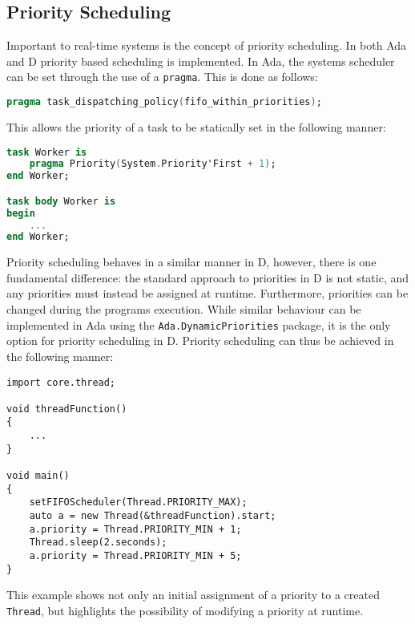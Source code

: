 \subsection{Priority Scheduling}
Important to real-time systems is the concept of priority scheduling. In both
Ada and D priority based scheduling is implemented. In Ada, the systems scheduler can
be set through the use of a \texttt{pragma}. This is done as follows: 
\begin{lstlisting}[language=Ada]
pragma task_dispatching_policy(fifo_within_priorities); 
\end{lstlisting}
This allows the priority of a task to be statically set in the following manner: 
\begin{lstlisting}[language=Ada]
task Worker is 
    pragma Priority(System.Priority'First + 1); 
end Worker;

task body Worker is 
begin 
    ...
end Worker; 
\end{lstlisting}
Priority scheduling behaves in a similar manner in D, however, there is one
fundamental difference: the standard approach to priorities in D is not static, 
and any priorities must instead be assigned at runtime. 
Furthermore, priorities can be changed during the programs execution. While similar
behaviour can be implemented in Ada using the
\texttt{Ada.Dynamic\textunderscore{}Priorities}
package, it is the only option for priority scheduling in D. 
Priority scheduling can thus be achieved in the following manner: 
\begin{lstlisting}
import core.thread; 

void threadFunction()
{
    ...
}

void main()
{
    setFIFOScheduler(Thread.PRIORITY_MAX);
    auto a = new Thread(&threadFunction).start;
    a.priority = Thread.PRIORITY_MIN + 1; 
    Thread.sleep(2.seconds); 
    a.priority = Thread.PRIORITY_MIN + 5; 
}
\end{lstlisting}
This example shows not only an initial assignment of a priority to a created
\texttt{Thread}, but highlights the possibility of modifying a priority at
runtime. 

